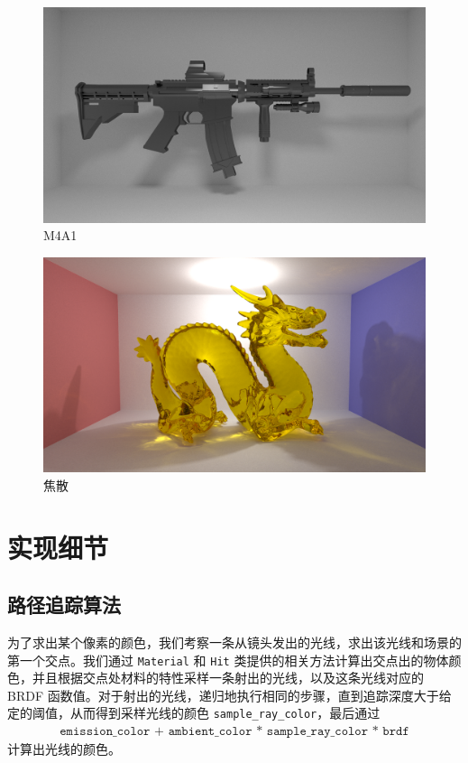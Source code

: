 \documentclass[cn]{report}
\let\t\texttt
\begin{document}
    \begin{figure}[htbp]
        \centering
        \includegraphics[width=\linewidth]{../results/m4a1.png}
        \caption{M4A1}
        \label{fig:m4a1}
    \end{figure}

    \begin{figure}[htbp]
        \centering
        \includegraphics[width=\linewidth]{../results/caustics.png}
        \caption{焦散}
        \label{fig:caustics}
    \end{figure}
    \fi

    \FloatBarrier

    \section{实现细节}

    \subsection{路径追踪算法}
    为了求出某个像素的颜色，我们考察一条从镜头发出的光线，求出该光线和场景的第一个交点。我们通过 \t{Material} 和 \t{Hit} 类提供的相关方法计算出交点出的物体颜色，并且根据交点处材料的特性采样一条射出的光线，以及这条光线对应的 BRDF 函数值。对于射出的光线，递归地执行相同的步骤，直到追踪深度大于给定的阈值，从而得到采样光线的颜色 \t{sample\_ray\_color}，最后通过 \begin{align}\t{emission\_color + ambient\_color * sample\_ray\_color * brdf} \end{align} 计算出光线的颜色。
\end{document}
